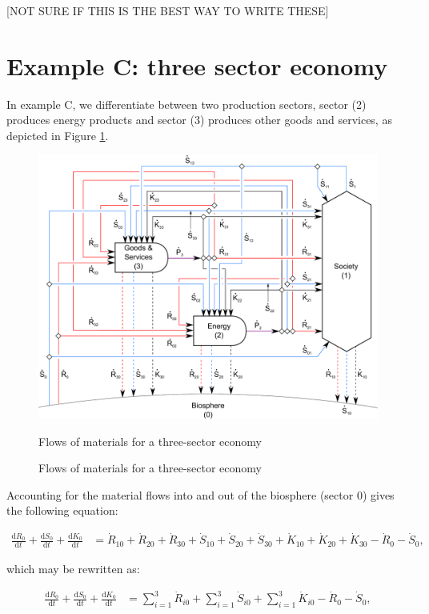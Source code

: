 [NOT SURE IF THIS IS THE BEST WAY TO WRITE THESE]


\section{Example C: three sector economy}
\label{sec:C_materials}

In example C, we differentiate between two production sectors, sector (2) produces energy
products and sector (3) produces other goods and services, as depicted in Figure
\ref{fig:C_materials}.

\begin{figure}[h!]
\centering
\includegraphics[width=0.8\linewidth]{Part_1/Chapter_Materials/images/3_sector_materials.pdf}
\caption{Flows of materials for a three-sector economy}{Flows of materials for a three-sector economy}
\label{fig:C_materials}
\end{figure}

Accounting for the material flows into and out of the biosphere (sector 0) gives the following equation:

\begin{align} \label{eq:C_CV_0}
	\frac{\mathrm{d}R_{0}}{\mathrm{d}t} 
	+ \frac{\mathrm{d}S_{0}}{\mathrm{d}t}	
	+ \frac{\mathrm{d}K_0}{\mathrm{d}t}		
	& =  \dot{R}_{10} + \dot{R}_{20} + \dot{R}_{30}
	+ \dot{S}_{10} + \dot{S}_{20} + \dot{S}_{30}
	+ \dot{K}_{10} + \dot{K}_{20} + \dot{K}_{30}
	- \dot{R}_{0} 
	- \dot{S}_{0},
\end{align}

\noindent which may be rewritten as:

\begin{align} \label{eq:C_CV_0_b}
	\frac{\mathrm{d}R_{0}}{\mathrm{d}t} 
	+ \frac{\mathrm{d}S_{0}}{\mathrm{d}t}	
	+ \frac{\mathrm{d}K_0}{\mathrm{d}t}		
	& =  \sum_{i = 1}^{3}\dot{R}_{i0}
	+ \sum_{i = 1}^{3}\dot{S}_{i0}
	+ \sum_{i = 1}^{3}\dot{K}_{i0}
	- \dot{R}_{0} 
	- \dot{S}_{0},
\end{align}

